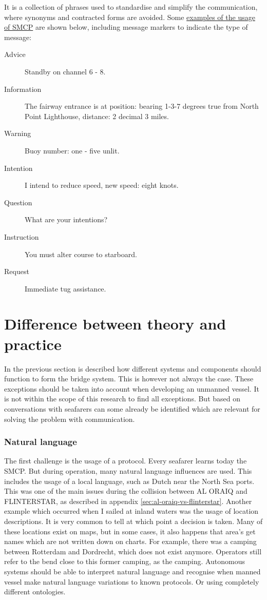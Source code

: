 It is a collection of phrases used to standardise and simplify the communication, where synonyms and contracted forms are avoided. Some \href{http://www.segeln.co.at/media/pdf/smcp.pdf}{examples of the usage of \ac{SMCP}} are shown below, including message markers to indicate the type of message:
\begin{description}
	\item [Advice] Standby on channel 6 - 8.
	\item [Information] The fairway entrance is at position: bearing 1-3-7 degrees true from North Point Lighthouse, distance: 2 decimal 3 miles.
	\item [Warning] Buoy number: one - five unlit.
	\item [Intention] I intend to reduce speed, new speed: eight knots.
	\item [Question] What are your intentions?
	\item [Instruction] You must alter course to starboard.
	\item [Request] Immediate tug assistance.
\end{description}

\section{Difference between theory and practice}
In the previous section is described how different systems and components should function to form the bridge system. This is however not always the case. These exceptions should be taken into account when developing an unmanned vessel. It is not within the scope of this research to find all exceptions. But based on conversations with seafarers can some already be identified which are relevant for solving the problem with communication.

\subsubsection{Natural language}
The first challenge is the usage of a protocol. Every seafarer learns today the \acf{SMCP}. But during operation, many natural language influences are used. This includes the usage of a local language, such as Dutch near the North Sea ports. This was one of the main issues during the collision between AL ORAIQ and FLINTERSTAR, as described in appendix \ref{sec:al-oraiq-vs-flinterstar}.
Another example which occurred when I sailed at inland waters was the usage of location descriptions. It is very common to tell at which point a decision is taken. Many of these locations exist on maps, but in some cases, it also happens that area's get names which are not written down on charts. For example, there was a camping between Rotterdam and Dordrecht, which does not exist anymore. Operators still refer to the bend close to this former camping, as the camping.
Autonomous systems should be able to interpret natural language and recognise when manned vessel make natural language variations to known protocols. Or using completely different ontologies. 

